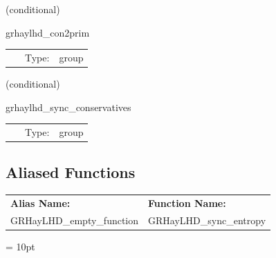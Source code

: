 \vspace{5mm}

   (conditional) 

\hspace{5mm} grhaylhd\_con2prim 

\hspace{5mm}{\it compute primitive variables from conservatives } 


\hspace{5mm}

 \begin{tabular*}{160mm}{cll} 
~ & Type:  & group \\ 
\end{tabular*} 


\vspace{5mm}

   (conditional) 

\hspace{5mm} grhaylhd\_sync\_conservatives 

\hspace{5mm}{\it sync allocated conservative variable ghost zones for c2p } 


\hspace{5mm}

 \begin{tabular*}{160mm}{cll} 
~ & Type:  & group \\ 
\end{tabular*} 


\subsection*{Aliased Functions}

\hspace{5mm}

 \begin{tabular*}{160mm}{ll} 

{\bf Alias Name:} ~~~~~~~ & {\bf Function Name:} \\ 
GRHayLHD\_empty\_function & GRHayLHD\_sync\_entropy \\ 
\end{tabular*} 



\vspace{5mm}\parskip = 10pt 
